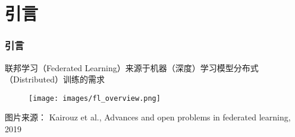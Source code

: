 
\begin{frame}
\titlepage %
\end{frame}

\begin{frame}
\tableofcontents %
\end{frame}







\section[Introduction]{引言}


\begin{frame}
\frametitle{引言}

联邦学习（Federated Learning）来源于机器（深度）学习模型分布式（Distributed）训练的需求

\begin{figure}
    \centering
    \texttt{[image: images/fl\_overview.png]}
\end{figure}

{\scriptsize
图片来源：\cite{kairouz2019advances_fl} Kairouz et al., Advances and open problems in federated learning, 2019
}

\end{frame}

